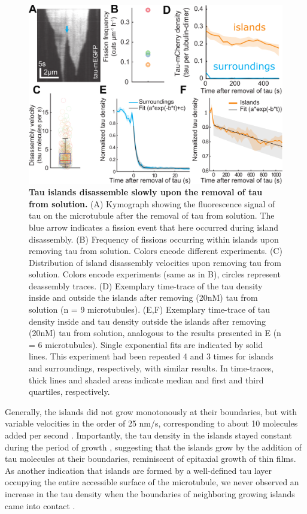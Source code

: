 \begin{figure}
	\centering
	\includegraphics[width=1\linewidth]{Figures/tauSHRINK.png}
	\caption[Tau islands disassemble slowly upon the removal of tau from solution.]{
	\textbf{Tau islands disassemble slowly upon the removal of tau from solution.} (A) Kymograph showing the fluorescence signal of tau on the microtubule after the removal of tau from solution. The blue arrow indicates a fission event that here occurred during island disassembly. (B) Frequency of fissions occurring within islands upon removing tau from solution. Colors encode different experiments. (C) Distribution of island disassembly velocities upon removing tau from solution. Colors encode experiments (same as in B), circles represent deassembly traces. (D) Exemplary time-trace of the tau density inside and outside the islands after removing (20nM) tau from solution (n = 9 microtubules). (E,F) Exemplary time-trace of tau density inside and tau density outside the islands after removing (20nM) tau from solution, analogous to the results presented in E (n = 6 microtubules). Single exponential fits are indicated by solid lines. This experiment had been repeated 4 and 3 times for islands and surroundings, respectively, with similar results. In time-traces, thick lines and shaded areas indicate median and first and third quartiles, respectively. 
		}\label{tauSHRINK}
\end{figure}
Generally, the islands did not grow monotonously at their boundaries, but with variable velocities in the order of 25 nm/s, corresponding to about 10 molecules added per second .  Importantly, the tau density in the islands stayed constant during the period of growth , suggesting that the islands grow by the addition of tau molecules at their boundaries, reminiscent of epitaxial growth of thin films. As another indication that islands are formed by a well-defined tau layer occupying the entire accessible surface of the microtubule, we never observed an increase in the tau density when the boundaries of neighboring growing islands came into contact .\par


